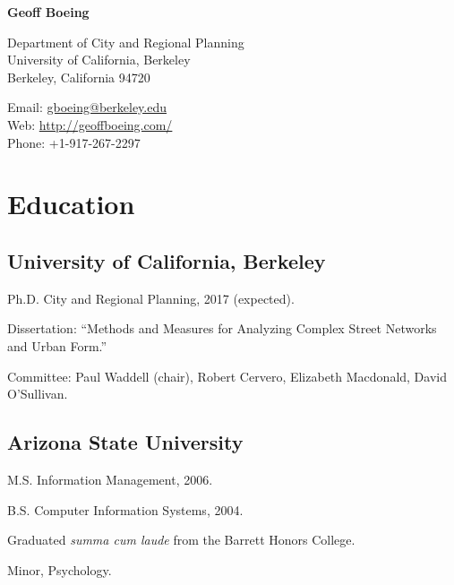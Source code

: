 \documentclass[11pt,letterpaper]{report}
\newcommand{\titlefont}[1]{{\titleface\bfseries\Huge{#1}}}
\renewenvironment{itemize}{
  \begin{list}{}{
      \setlength{\leftmargin}{1.75em}
      \setlength{\itemsep}{0.25em}
      \setlength{\parskip}{0em}
      \setlength{\parsep}{0.25em}
    }
}{
  \end{list}
}
\newcommand{\myname}{Geoff Boeing}
\begin{document}
\titlefont{\myname}

\vspace{1em}
\begin{minipage}[t]{0.495\textwidth}
  Department of City and Regional Planning \\
  University of California, Berkeley \\
  Berkeley, California 94720
\end{minipage}
\begin{minipage}[t]{0.495\textwidth}
  Email: \href{mailto:gboeing@berkeley.edu}{gboeing@berkeley.edu} \\
  Web: \href{http://geoffboeing.com/}{http://geoffboeing.com/} \\
  Phone: +1-917-267-2297
\end{minipage}
\vspace{1em}



\section*{Education}

\subsection*{University of California, Berkeley}
\begin{itemize}
\item Ph.D. City and Regional Planning, 2017 (expected).   
  \begin{itemize}
  \item Dissertation: \enquote{Methods and Measures for Analyzing Complex Street Networks and Urban Form.}
  \item Committee: Paul Waddell (chair), Robert Cervero, Elizabeth Macdonald, David O'Sullivan.
  \end{itemize}  
\end{itemize}
  
\subsection*{Arizona State University}
\begin{itemize}
\item M.S. Information Management, 2006.
\item B.S. Computer Information Systems, 2004.  
  \begin{itemize}
  \item Graduated \emph{summa cum laude} from the Barrett Honors College.
  \item Minor, Psychology.
  \end{itemize}
\end{itemize}
\end{document}
